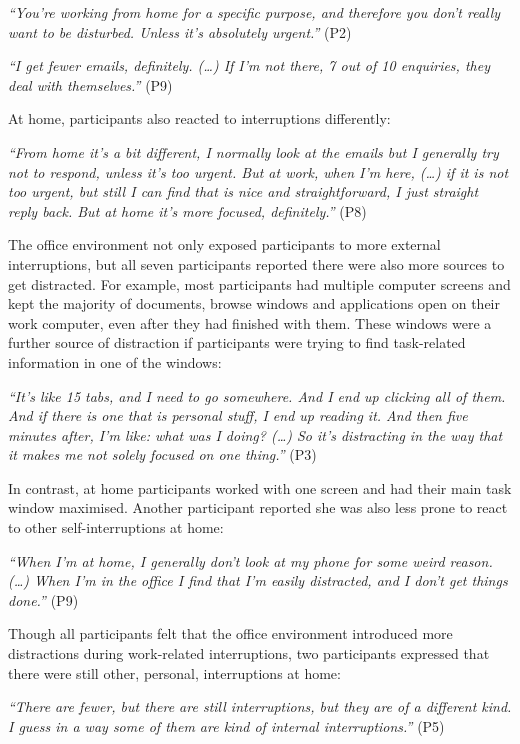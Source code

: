 \textit{“You’re working from home for a specific purpose, and therefore you don’t really want to be disturbed. Unless it’s absolutely urgent.”} (P2)
 
\textit{“I get fewer emails, definitely. (…) If I’m not there, 7 out of 10 enquiries, they deal with themselves.”} (P9)

At home, participants also reacted to interruptions differently:

\textit{“From home it’s a bit different, I normally look at the emails but I generally try not to respond, unless it’s too urgent. But at work, when I’m here, (…) if it is not too urgent, but still I can find that is nice and straightforward, I just straight reply back. But at home it’s more focused, definitely.”} (P8)

The office environment not only exposed participants to more external interruptions, but all seven participants reported there were also more sources to get distracted. For example, most participants had multiple computer screens and kept the majority of documents, browse windows and applications open on their work computer, even after they had finished with them. These windows were a further source of distraction if participants were trying to find task-related information in one of the windows:

\textit{“It’s like 15 tabs, and I need to go somewhere. And I end up clicking all of them. And if there is one that is personal stuff, I end up reading it. And then five minutes after, I’m like: what was I doing? (…) So it’s distracting in the way that it makes me not solely focused on one thing.”} (P3)

In contrast, at home participants worked with one screen and had their main task window maximised. Another participant reported she was also less prone to react to other self-interruptions at home:

\textit{“When I’m at home, I generally don’t look at my phone for some weird reason. (…) When I’m in the office I find that I’m easily distracted, and I don’t get things done.”} (P9)

Though all participants felt that the office environment introduced more distractions during work-related interruptions, two participants expressed that there were still other, personal, interruptions at home:

\textit{“There are fewer, but there are still interruptions, but they are of a different kind. I guess in a way some of them are kind of internal interruptions.”} (P5)

